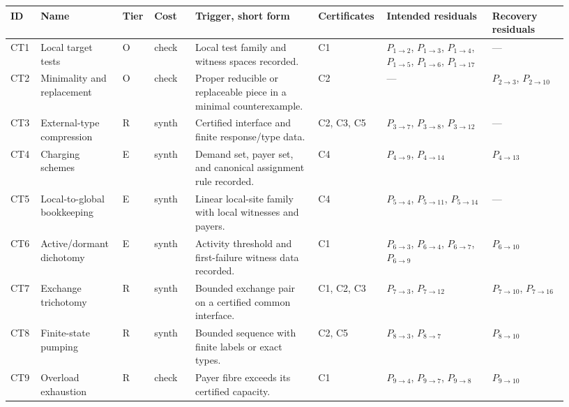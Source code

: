 \documentclass[
  11pt,
]{article}
\theoremstyle{definition}
\begin{document}
\begingroup
\tiny
\setlength{\tabcolsep}{0.8pt}
\begin{longtable}[]{@{}
  >{\raggedright\arraybackslash}p{0.05\linewidth}
  >{\raggedright\arraybackslash}p{0.14\linewidth}
  >{\raggedright\arraybackslash}p{0.05\linewidth}
  >{\raggedright\arraybackslash}p{0.07\linewidth}
  >{\raggedright\arraybackslash}p{0.21\linewidth}
  >{\raggedright\arraybackslash}p{0.10\linewidth}
  >{\raggedright\arraybackslash}p{0.18\linewidth}
  >{\raggedright\arraybackslash}p{0.13\linewidth}@{}}
\toprule\noalign{}
ID & Name & Tier & Cost & Trigger, short form & Certificates & Intended residuals & Recovery residuals \\
\midrule\noalign{}
\endhead
\bottomrule\noalign{}
\endlastfoot
CT1 & Local target tests & O & check & Local test family and witness spaces recorded. & C1 & \(P_{1\to2}\), \(P_{1\to3}\), \(P_{1\to4}\), \(P_{1\to5}\), \(P_{1\to6}\), \(P_{1\to17}\) & --- \\
CT2 & Minimality and replacement & O & check & Proper reducible or replaceable piece in a minimal counterexample. & C2 & --- & \(P_{2\to3}\), \(P_{2\to10}\) \\
CT3 & External-type compression & R & synth & Certified interface and finite response/type data. & C2, C3, C5 & \(P_{3\to7}\), \(P_{3\to8}\), \(P_{3\to12}\) & --- \\
CT4 & Charging schemes & E & synth & Demand set, payer set, and canonical assignment rule recorded. & C4 & \(P_{4\to9}\), \(P_{4\to14}\) & \(P_{4\to13}\) \\
CT5 & Local-to-global bookkeeping & E & synth & Linear local-site family with local witnesses and payers. & C4 & \(P_{5\to4}\), \(P_{5\to11}\), \(P_{5\to14}\) & --- \\
CT6 & Active/dormant dichotomy & E & synth & Activity threshold and first-failure witness data recorded. & C1 & \(P_{6\to3}\), \(P_{6\to4}\), \(P_{6\to7}\), \(P_{6\to9}\) & \(P_{6\to10}\) \\
CT7 & Exchange trichotomy & R & synth & Bounded exchange pair on a certified common interface. & C1, C2, C3 & \(P_{7\to3}\), \(P_{7\to12}\) & \(P_{7\to10}\), \(P_{7\to16}\) \\
CT8 & Finite-state pumping & R & synth & Bounded sequence with finite labels or exact types. & C2, C5 & \(P_{8\to3}\), \(P_{8\to7}\) & \(P_{8\to10}\) \\
CT9 & Overload exhaustion & R & check & Payer fibre exceeds its certified capacity. & C1 & \(P_{9\to4}\), \(P_{9\to7}\), \(P_{9\to8}\) & \(P_{9\to10}\) \\

\end{longtable}
\end{document}
